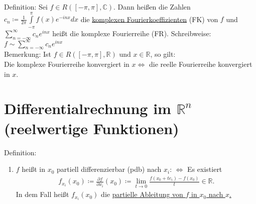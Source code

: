 \documentclass{article}
\begin{document}
Definition: Sei $f \in R([-\pi,\pi],\mathbb{C})$. Dann heißen die Zahlen $c_n \coloneqq \frac{1}{2\pi} \int \limits_{-\pi}^{\pi} f(x) e^{-inx} dx$
die \underline{komplexen Fourierkoeffizienten} (FK) von $f$ und $\sum \limits_{n= - \infty}^{\infty} c_n e^{inx}$ heißt
die komplexe Fourierreihe (FR). Schreibweise: $f \sim \sum \limits_{n=- \infty}^{\infty} c_n e^{inx}$ \\
Bemerkung: Ist $f \in R([-\pi, \pi], \mathbb{R}) \text{ und } x \in \mathbb{R}$, so gilt: \\
Die komplexe Fourierreihe konvergiert in $x \Leftrightarrow$ die reelle Fourierreihe konvergiert in $x$.

\section{Differentialrechnung im $\mathbb{R}^n$ (reelwertige Funktionen)}
Definition:
\begin{enumerate}
    \item $f$ heißt in $x_0$ partiell differenzierbar (pdb) nach $x_i$: $\Leftrightarrow$
    Es existiert 
    \begin{align*}
        f_{x_i}(x_0) \coloneqq \frac{\partial f}{\partial x_i}(x_0) \coloneqq \lim \limits_{t \to 0} \frac{f(x_0 + te_i) - f(x_0)}{t} \in \mathbb{R}.
    \end{align*}
    In dem Fall heißt $f_{x_i}(x_0)$ die \underline{partielle Ableitung von $f$ in $x_0$ nach $x$.}
\end{enumerate}
\end{document}
